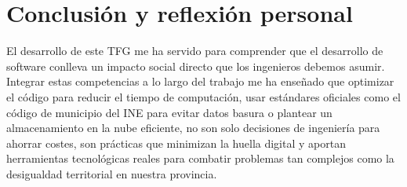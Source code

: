 \section{Conclusión y reflexión personal}
El desarrollo de este TFG me ha servido para comprender que el desarrollo de software conlleva un impacto social directo que los ingenieros debemos asumir. Integrar estas competencias a lo largo del trabajo me ha enseñado que optimizar el código para reducir el tiempo de computación, usar estándares oficiales como el código de municipio del INE para evitar datos basura o plantear un almacenamiento en la nube eficiente, no son solo decisiones de ingeniería para ahorrar costes, son prácticas que minimizan la huella digital y aportan herramientas tecnológicas reales para combatir problemas tan complejos como la desigualdad territorial en nuestra provincia.